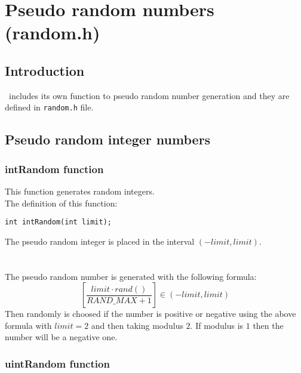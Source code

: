 %
%

\chapter{Pseudo random numbers (random.h)} \label{ch:random}

\section{Introduction}

\BI \ includes its own function to pseudo random number generation and they are defined in \texttt{random.h} file.\\


\section{Pseudo random integer numbers}

\subsection{\textbf{intRandom} function} \label{sec:intRandom}

This function generates random integers.\\

The definition of this function:
%
\begin{verbatim}
int intRandom(int limit);  
\end{verbatim}
%
The pseudo random integer is placed in the interval $(-limit,limit)$.\\ \\
%
%
\ \\
%
The pseudo random number is generated with the following formula:
%
\begin{displaymath}
\left[ \frac{limit \cdot rand()}{RAND\_MAX + 1} \right] \in (-limit,limit)
\end{displaymath}
%
Then randomly is choosed if the number is positive or negative using the above formula with $limit=2$ and then taking modulus $2$. If modulus is $1$ then the number will be a negative one.

\subsection{\textbf{uintRandom} function} \label{sec:uintRandom}

